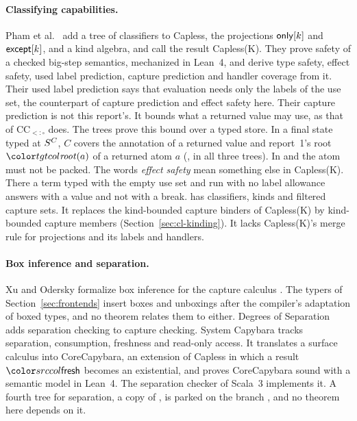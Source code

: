 \paragraph{Classifying capabilities.}
Pham et al.\ \cite{pham2026classifying} add a tree of classifiers to Capless, the projections $\mathsf{only}[k]$ and $\mathsf{except}[k]$, and a kind algebra, and call the result Capless(K). They prove safety of a checked big-step semantics, mechanized in Lean~4, and derive type safety, effect safety, used label prediction, capture prediction and handler coverage from it. Their used label prediction says that evaluation needs only the labels of the use set, the counterpart of capture prediction and effect safety here. Their capture prediction is not this report's. It bounds what a returned value may use, as that of $\mathrm{CC}_{<:\square}$ does. The trees prove this bound over a typed store. In a final state typed at $S^{C}$, $C$ covers the annotation of a returned value and report~1's root $\rt{a}$ of a returned atom $a$ (, in all three trees). In \treeCC and \treeCL the atom must not be packed. The words \emph{effect safety} mean something else in Capless(K). There a term typed with the empty use set and run with no label allowance answers with a value and not with a break. \treeCL has classifiers, kinds and filtered capture sets. It replaces the kind-bounded capture binders of Capless(K) by kind-bounded capture members (Section~\ref{sec:cl-kinding}). It lacks Capless(K)'s merge rule for projections and its labels and handlers.

\paragraph{Box inference and separation.}
Xu and Odersky formalize box inference for the capture calculus \cite{xu2023boxinference}. The typers of Section~\ref{sec:frontends} insert boxes and unboxings after the compiler's adaptation of boxed types, and no theorem relates them to either. Degrees of Separation \cite{xu2024separation} adds separation checking to capture checking. System Capybara \cite{xu2026capybara} tracks separation, consumption, freshness and read-only access. It translates a surface calculus into CoreCapybara, an extension of Capless in which a result $\cfresh$ becomes an existential, and proves CoreCapybara sound with a semantic model in Lean~4. The separation checker of Scala~3 implements it. A fourth tree for separation, a copy of \treeCC, is parked on the branch , and no theorem here depends on it.


